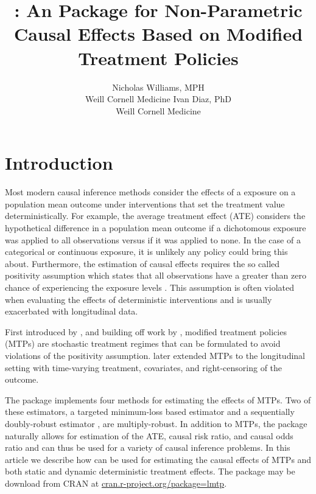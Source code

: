 \documentclass[]{jss}
\author{
Nicholas Williams, MPH\\Weill Cornell Medicine \And Ivan Diaz,
PhD\\Weill Cornell Medicine
}
\title{\pkg{lmtp}: An \proglang{R} Package for Non-Parametric Causal
Effects Based on Modified Treatment Policies}
\begin{document}
\hypertarget{introduction}{%
\section{Introduction}\label{introduction}}

Most modern causal inference methods consider the effects of a exposure
on a population mean outcome under interventions that set the treatment
value deterministically. For example, the average treatment effect (ATE)
considers the hypothetical difference in a population mean outcome if a
dichotomous exposure was applied to all observations versus if it was applied
to none. In the case of a categorical or continuous exposure,
it is unlikely any policy could bring this about. Furthermore, the
estimation of causal effects requires the so called positivity
assumption which states that all observations have a greater than zero
chance of experiencing the exposure levels
\citep{rosenbaumCentralRolePropensity1983}. This assumption is often
violated when evaluating the effects of deterministic interventions and
is usually exacerbated with longitudinal data.

First introduced by \citet{haneuseEstimationEffectInterventions2013},
and building off work by \citet{munozPopulationInterventionCausal2012},
modified treatment policies (MTPs) are stochastic treatment regimes that
can be formulated to avoid violations of the positivity assumption.
\citet{diazNonparametricCausalEffects2020a} later extended MTPs to the
longitudinal setting with time-varying treatment, covariates, and
right-censoring of the outcome.

The package  implements four methods for estimating the
effects of MTPs. Two of these estimators, a targeted minimum-loss based
estimator \citep{laanTargetedLearningCausal2011a, laanTargetedMaximumLikelihood2006}
and a sequentially doubly-robust estimator \citep{buckleyLinearRegressionCensored1979, fanCensoredRegressionLocal1994,
vanderlaanUnifiedCrossValidationMethodology2003, rotnitzkyDoublyRobustEstimation2006, rubinDoublyRobustCensoring2006, 
kennedyNonparametricMethodsDoubly2017}, are multiply-robust. In addition to MTPs, the package
naturally allows for estimation of the ATE, causal risk ratio, and
causal odds ratio and can thus be used for a variety of causal inference
problems. In this article we describe how  can be used for
estimating the causal effects of MTPs and both static and dynamic
deterministic treatment effects. The package may be download from CRAN
at \url{cran.r-project.org/package=lmtp}.
\end{document}
